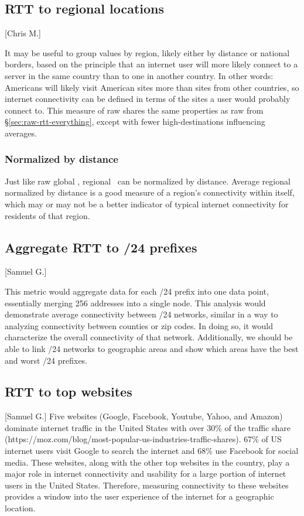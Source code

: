 \subsection{RTT to regional locations}[Chris M.]

It may be useful to group \rtt values by region, likely either by distance or national borders, based on the principle that an internet user will more likely connect to a server in the same country than to one in another country. In other words: Americans will likely visit American sites more than sites from other countries, so internet connectivity can be defined in terms of the sites a user would probably connect to. This measure of raw \rtt shares the same properties as raw \rtt from \S{}\ref{sec:raw-rtt-everything}, except with fewer high-\rtt destinations influencing averages.

\subsubsection{Normalized by distance}

Just like raw global \rtts, regional \rtts\ can be normalized by distance. Average regional \rtt normalized by distance is a good measure of a region's connectivity within itself, which may or may not be a better indicator of typical internet connectivity for residents of that region.

\subsection{Aggregate RTT to /24 prefixes}[Samuel G.]

This metric would aggregate data for each /24 prefix into one data point, essentially merging 256 \ip addresses into a single node. This analysis would demonstrate average connectivity between /24 networks, similar in a way to analyzing connectivity between counties or zip codes. In doing so, it would characterize the overall connectivity of that network. Additionally, we should be able to link /24 networks to geographic areas and show which areas have the best and worst /24 prefixes.

\subsection{RTT to top websites}[Samuel G.]
Five websites (Google, Facebook, Youtube, Yahoo, and Amazon) dominate internet traffic in the United States with over 30\% of the traffic share (https://moz.com/blog/most-popular-us-industries-traffic-shares). 67\% of US internet users visit Google to search the internet and 68\% use Facebook for social media. These websites, along with the other top websites in the country, play a major role in internet connectivity and usability for a large portion of internet users in the United States. Therefore, measuring connectivity to these websites provides a window into the user experience of the internet for a geographic location.

